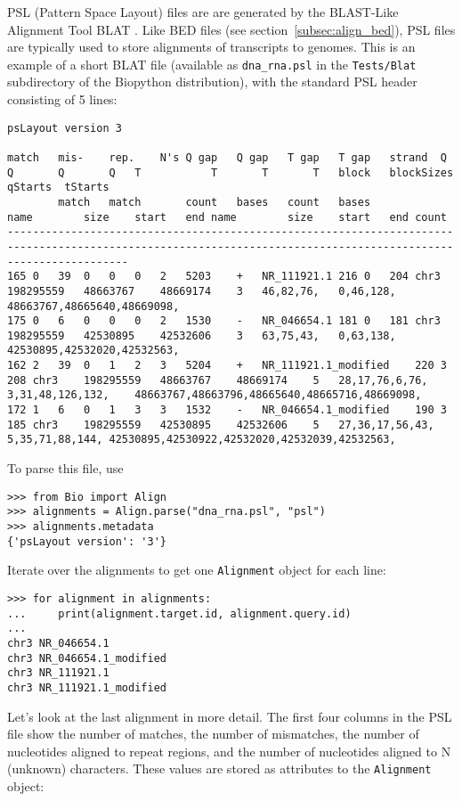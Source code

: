 PSL (Pattern Space Layout) files are are generated by the BLAST-Like Alignment Tool BLAT \cite{kent2002}. Like BED files (see section~\ref{subsec:align_bed}), PSL files are typically used to store alignments of transcripts to genomes.
This is an example of a short BLAT file (available as \verb|dna_rna.psl| in the \verb|Tests/Blat| subdirectory of the Biopython distribution), with the standard PSL header consisting of 5 lines:
\begin{verbatim}
psLayout version 3

match	mis- 	rep. 	N's	Q gap	Q gap	T gap	T gap	strand	Q        	Q   	Q    	Q  	T        	T   	T    	T  	block	blockSizes 	qStarts	 tStarts
     	match	match	   	count	bases	count	bases	      	name     	size	start	end	name     	size	start	end	count
---------------------------------------------------------------------------------------------------------------------------------------------------------------
165	0	39	0	0	0	2	5203	+	NR_111921.1	216	0	204	chr3	198295559	48663767	48669174	3	46,82,76,	0,46,128,	48663767,48665640,48669098,
175	0	6	0	0	0	2	1530	-	NR_046654.1	181	0	181	chr3	198295559	42530895	42532606	3	63,75,43,	0,63,138,	42530895,42532020,42532563,
162	2	39	0	1	2	3	5204	+	NR_111921.1_modified	220	3	208	chr3	198295559	48663767	48669174	5	28,17,76,6,76,	3,31,48,126,132,	48663767,48663796,48665640,48665716,48669098,
172	1	6	0	1	3	3	1532	-	NR_046654.1_modified	190	3	185	chr3	198295559	42530895	42532606	5	27,36,17,56,43,	5,35,71,88,144,	42530895,42530922,42532020,42532039,42532563,
\end{verbatim}
To parse this file, use
\begin{verbatim}
>>> from Bio import Align
>>> alignments = Align.parse("dna_rna.psl", "psl")
>>> alignments.metadata
{'psLayout version': '3'}
\end{verbatim}
Iterate over the alignments to get one \verb|Alignment| object for each line:
\begin{verbatim}
>>> for alignment in alignments:
...     print(alignment.target.id, alignment.query.id)
...
chr3 NR_046654.1
chr3 NR_046654.1_modified
chr3 NR_111921.1
chr3 NR_111921.1_modified
\end{verbatim}
Let's look at the last alignment in more detail. The first four columns in the PSL file show the number of matches, the number of mismatches, the number of nucleotides aligned to repeat regions, and the number of nucleotides aligned to N (unknown) characters. These values are stored as attributes to the \verb|Alignment| object:

